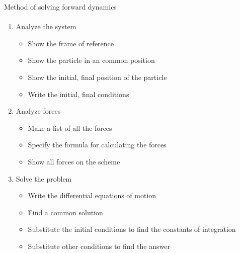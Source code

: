\documentclass[aspectratio=169]{beamer}
\begin{document}
\begin{frame}[t]{Method of solving forward dynamics}
    \framesubtitle{}
    \vspace*{-0.6cm}
    \begin{multicols}{2}
        \begin{enumerate}
            \item Analyze the system
                  \begin{itemize}
                      \small
                      \item Show the frame of reference
                      \item Show the particle in an common position
                      \item Show the initial, final position of the particle
                      \item Write the initial, final conditions
                  \end{itemize}
            \item Analyze forces
                  \begin{itemize}
                      \small
                      \item Make a list of all the forces
                      \item Specify the formula for calculating the forces
                      \item Show all forces on the scheme
                  \end{itemize}
            \item Solve the problem
                  \begin{itemize}
                      \small
                      \item Write the differential equations of motion
                      \item Find a common solution
                      \item Substitute the initial conditions to find the
                            constants of integration
                      \item Substitute other conditions to find the answer
                  \end{itemize}
        \end{enumerate}
    \end{multicols}
\end{frame}
\end{document}
